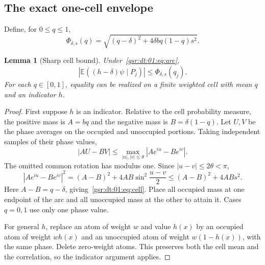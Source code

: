 \documentclass[11pt,letterpaper]{article}
\numberwithin{equation}{section}
\newtheorem{lemma}[theorem]{Lemma}
\theoremstyle{definition}
\theoremstyle{remark}
\newcommand{\E}{\mathbb E}
\newcommand{\1}{\mathbf 1}
\newcommand{\abs}[1]{\left|#1\right|}
\newcommand{\ph}{\Phi_{\delta,s}}
\begin{document}
\subsection{The exact one-cell envelope}
Define, for $0\le q\le1$,
\begin{equation}\label{gsr:dt:01:eq:Phi}
 \ph(q)=\sqrt{(q-\delta)^2+4\delta bq(1-q)s^2}.
\end{equation}

\begin{lemma}[Sharp cell bound]\label{gsr:dt:01:lem:cell}
Under~\eqref{gsr:dt:01:eq:arc},
\begin{equation}\label{gsr:dt:01:eq:cell}
 \abs{\E((h-\delta)\psi\mid P_j)}\le\ph(q_j).
\end{equation}
For each $q\in[0,1]$, equality can be realized on a finite weighted cell
with mean $q$ and an indicator $h$.
\end{lemma}
\begin{proof}
First suppose $h$ is an indicator. Relative to the cell probability
measure, the positive mass is $A=bq$ and the negative mass is
$B=\delta(1-q)$. Let $U,V$ be the phase averages on the occupied and
unoccupied portions. Taking independent samples of their phase values,
\[
 |AU-BV|\le\max_{|u|,|v|\le\theta}
             |Ae^{iu}-Be^{iv}|.
\]
The omitted common rotation has modulus one. Since $|u-v|\le2\theta<\pi$,
\[
 |Ae^{iu}-Be^{iv}|^2
  =(A-B)^2+4AB\sin^2\frac{u-v}{2}
  \le(A-B)^2+4ABs^2.
\]
Here $A-B=q-\delta$, giving~\eqref{gsr:dt:01:eq:cell}. Place all occupied mass at
one endpoint of the arc and all unoccupied mass at the other to attain
it. Cases $q=0,1$ use only one phase value.

For general $h$, replace an atom of weight $w$ and value $h(x)$ by an
occupied atom of weight $wh(x)$ and an unoccupied atom of weight
$w(1-h(x))$, with the same phase. Delete zero-weight atoms. This preserves
both the cell mean and the correlation, so the indicator argument applies.
\end{proof}
\end{document}
